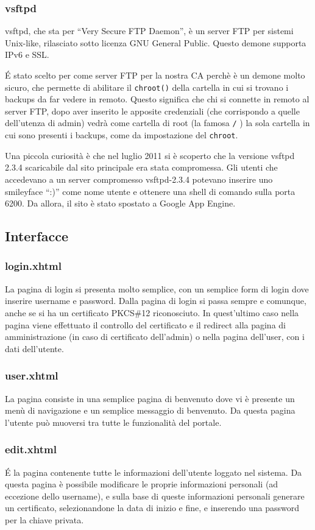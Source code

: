 \documentclass{article}
\begin{document}
\subsubsection*{vsftpd}
vsftpd, che sta per ``Very Secure FTP Daemon'', è un server FTP per sistemi Unix-like, rilasciato sotto licenza GNU General Public. Questo demone supporta IPv6 e SSL.

\'E stato scelto per come server FTP per la nostra CA perchè è un demone molto sicuro, che permette di abilitare il {\tt chroot()} della cartella in cui si trovano i backups da far vedere in remoto. Questo significa che chi si connette in remoto al server FTP, dopo aver inserito le apposite credenziali (che corrispondo a quelle dell'utenza di admin) vedrà come cartella di root (la famosa {\tt /} ) la sola cartella in cui sono presenti i backups, come da impostazione del {\tt chroot}.

Una piccola curiosità è che nel luglio 2011 si è scoperto che la versione vsftpd 2.3.4 scaricabile dal sito principale era stata compromessa. Gli utenti che accedevano a un server compromesso vsftpd-2.3.4 potevano inserire uno  smileyface ``:)'' come nome utente e ottenere una shell di comando sulla porta 6200. Da allora, il sito è stato spostato a Google App Engine.

\subsection{Interfacce}
\subsubsection*{login.xhtml}
La pagina di login si presenta molto semplice, con un semplice form di login dove inserire username e password. Dalla pagina di login si passa sempre e comunque, anche se si ha un certificato PKCS\#12 riconosciuto. In quest'ultimo caso nella pagina viene effettuato il controllo del certificato e il redirect alla pagina di amministrazione (in caso di certificato dell'admin) o nella pagina dell'user, con i dati dell'utente.
\subsubsection*{user.xhtml}
La pagina consiste in una semplice pagina di benvenuto dove vi è presente un menù di navigazione e un semplice messaggio di benvenuto. Da questa pagina l'utente può muoversi tra tutte le funzionalità del portale.
\subsubsection*{edit.xhtml}
\'E la pagina contenente tutte le informazioni dell'utente loggato nel sistema. Da questa pagina è possibile modificare le proprie informazioni personali (ad eccezione dello username), e sulla base di queste informazioni personali generare un certificato, selezionandone la data di inizio e fine, e inserendo una password per la chiave privata.
\end{document}
